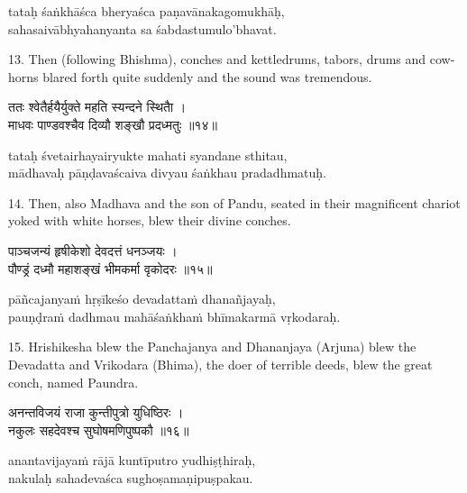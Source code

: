 \begin{transliteration}
tataḥ śaṅkhāśca bheryaśca paṇavānakagomukhāḥ, \\
sahasaivābhyahanyanta sa śabdastumulo'bhavat.
\end{transliteration}

13. Then (following Bhishma), conches and kettledrums, tabors, drums and
cow-horns blared forth quite suddenly and the sound was tremendous.

\begin{gitaverse}
ततः श्वेतैर्हयैर्युक्ते महति स्यन्दने स्थितैा । \\
माधवः पाण्डवश्चैव दिव्यौ शङ्खौ प्रदध्मतुः ॥१४॥
\end{gitaverse}

\begin{transliteration}
tataḥ śvetairhayairyukte mahati syandane sthitau, \\
mādhavaḥ pāṇḍavaścaiva divyau śaṅkhau pradadhmatuḥ.
\end{transliteration}

14. Then, also Madhava and the son of Pandu, seated in their magnificent
chariot yoked with white horses, blew their divine conches.

\begin{gitaverse}
पाञ्चजन्यं हृषीकेशो देवदत्तं धनञ्जयः । \\
पौण्ड्रं दध्मौ महाशङ्खं भीमकर्मा वृकोदरः ॥१५॥
\end{gitaverse}

\begin{transliteration}
pāñcajanyaṁ hṛṣīkeśo devadattaṁ dhanañjayaḥ, \\
pauṇḍraṁ dadhmau mahāśaṅkhaṁ bhīmakarmā vṛkodaraḥ.
\end{transliteration}

15. Hrishikesha blew the Panchajanya and Dhananjaya (Arjuna) blew the Devadatta
and Vrikodara (Bhima), the doer of terrible deeds, blew the great conch, named
Paundra.

\begin{gitaverse}
अनन्तविजयं राजा कुन्तीपुत्रो युधिष्ठिरः । \\
नकुलः सहदेवश्च सुघोषमणिपुष्पकौ ॥१६॥
\end{gitaverse}

\begin{transliteration}
anantavijayaṁ rājā kuntīputro yudhiṣṭhiraḥ, \\
nakulaḥ sahadevaśca sughoṣamaṇipuṣpakau.
\end{transliteration}

